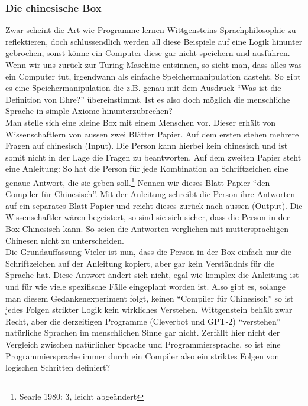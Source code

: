 \documentclass[10pt,a4paper]{article}
\begin{document}
\subsubsection{Die chinesische Box}
Zwar scheint die Art wie Programme lernen Wittgensteins Sprachphilosophie zu reflektieren, doch schlussendlich werden all diese Beispiele auf eine Logik hinunter gebrochen, sonst könne ein Computer diese gar nicht speichern und ausführen. Wenn wir uns zurück zur Turing-Maschine entsinnen, so sieht man, dass alles was ein Computer tut, irgendwann als einfache Speichermanipulation dasteht. So gibt es eine Speichermanipulation die z.B. genau mit dem Ausdruck \enquote{Was ist die Definition von Ehre?} übereinstimmt. Ist es also doch möglich die menschliche Sprache in simple Axiome hinunterzubrechen? \\
Man stelle sich eine kleine Box mit einem Menschen vor. Dieser erhält von Wissenschaftlern von aussen zwei Blätter Papier. Auf dem ersten stehen mehrere Fragen auf chinesisch (Input). Die Person kann hierbei kein chinesisch und ist somit nicht in der Lage die Fragen zu beantworten. Auf dem zweiten Papier steht eine Anleitung: So hat die Person für jede Kombination an Schriftzeichen eine genaue Antwort, die sie geben soll.\footnote{Searle 1980: 3, leicht abgeändert} Nennen wir dieses Blatt Papier \enquote{den Compiler für Chinesisch}. Mit der Anleitung schreibt die Person ihre Antworten auf ein separates Blatt Papier und reicht dieses zurück nach aussen (Output). Die Wissenschaftler wären begeistert, so sind sie sich sicher, dass die Person in der Box Chinesisch kann. So seien die Antworten verglichen mit muttersprachigen Chinesen nicht zu unterscheiden. \\
Die Grundauffassung Vieler ist nun, dass die Person in der Box einfach nur die Schriftzeichen auf der Anleitung kopiert, aber gar kein Verständnis für die Sprache hat. Diese Antwort ändert sich nicht, egal wie komplex die Anleitung ist und für wie viele spezifische Fälle eingeplant worden ist. Also gibt es, solange man diesem Gedankenexperiment folgt, keinen \enquote{Compiler für Chinesisch} so ist jedes Folgen strikter Logik kein wirkliches Verstehen. Wittgenstein behält zwar Recht, aber die derzeitigen Programme (Cleverbot und GPT-2) \enquote{verstehen} natürliche Sprachen im menschlichen Sinne gar nicht. Zerfällt hier nicht der Vergleich zwischen natürlicher Sprache und Programmiersprache, so ist eine Programmiersprache immer durch ein Compiler also ein striktes Folgen von logischen Schritten definiert?
\end{document}
